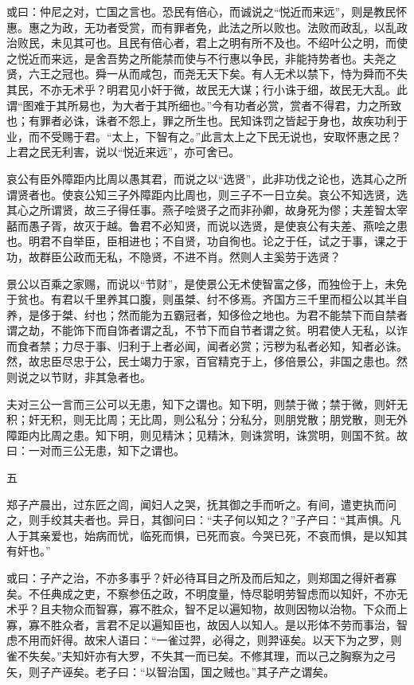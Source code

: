 \documentclass[]{article}
\begin{document}
或曰：仲尼之对，亡国之言也。恐民有倍心，而诚说之``悦近而来远''，则是教民怀惠。惠之为政，无功者受赏，而有罪者免，此法之所以败也。法败而政乱，以乱政治败民，未见其可也。且民有倍心者，君上之明有所不及也。不绍叶公之明，而使之悦近而来远，是舍吾势之所能禁而使与不行惠以争民，非能持势者也。夫尧之贤，六王之冠也。舜一从而咸包，而尧无天下矣。有人无术以禁下，恃为舜而不失其民，不亦无术乎？明君见小奸于微，故民无大谋；行小诛于细，故民无大乱。此谓``图难于其所易也，为大者于其所细也。''今有功者必赏，赏者不得君，力之所致也；有罪者必诛，诛者不怨上，罪之所生也。民知诛罚之皆起于身也，故疾功利于业，而不受赐于君。``太上，下智有之。''此言太上之下民无说也，安取怀惠之民？上君之民无利害，说以``悦近来远''，亦可舍已。

哀公有臣外障距内比周以愚其君，而说之以``选贤''，此非功伐之论也，选其心之所谓贤者也。使哀公知三子外障距内比周也，则三子不一日立矣。哀公不知选贤，选其心之所谓贤，故三子得任事。燕子哙贤子之而非孙卿，故身死为僇；夫差智太宰嚭而愚子胥，故灭于越。鲁君不必知贤，而说以选贤，是使哀公有夫差、燕哙之患也。明君不自举臣，臣相进也；不自贤，功自徇也。论之于任，试之于事，课之于功，故群臣公政而无私，不隐贤，不进不肖。然则人主奚劳于选贤？

景公以百乘之家赐，而说以``节财''，是使景公无术使智富之侈，而独俭于上，未免于贫也。有君以千里养其口腹，则虽桀、纣不侈焉。齐国方三千里而桓公以其半自养，是侈于桀、纣也；然而能为五霸冠者，知侈俭之地也。为君不能禁下而自禁者谓之劫，不能饰下而自饰者谓之乱，不节下而自节者谓之贫。明君使人无私，以诈而食者禁；力尽于事、归利于上者必闻，闻者必赏；污秽为私者必知，知者必诛。然，故忠臣尽忠于公，民士竭力于家，百官精克于上，侈倍景公，非国之患也。然则说之以节财，非其急者也。

夫对三公一言而三公可以无患，知下之谓也。知下明，则禁于微；禁于微，则奸无积；奸无积，则无比周；无比周，则公私分；分私分，则朋党散；朋党散，则无外障距内比周之患。知下明，则见精沐；见精沐，则诛赏明，诛赏明，则国不贫。故曰：一对而三公无患，知下之谓也。

五

郑子产晨出，过东匠之闾，闻妇人之哭，抚其御之手而听之。有间，遣吏执而问之，则手绞其夫者也。异日，其御问曰：``夫子何以知之？''子产曰：``其声惧。凡人于其亲爱也，始病而忧，临死而惧，已死而哀。今哭已死，不哀而惧，是以知其有奸也。''

或曰：子产之治，不亦多事乎？奸必待耳目之所及而后知之，则郑国之得奸者寡矣。不任典成之吏，不察参伍之政，不明度量，恃尽聪明劳智虑而以知奸，不亦无术乎？且夫物众而智寡，寡不胜众，智不足以遍知物，故则因物以治物。下众而上寡，寡不胜众者，言君不足以遍知臣也，故因人以知人。是以形体不劳而事治，智虑不用而奸得。故宋人语曰：``一雀过羿，必得之，则羿诬矣。以天下为之罗，则雀不失矣。''夫知奸亦有大罗，不失其一而已矣。不修其理，而以己之胸察为之弓矢，则子产诬矣。老子曰：``以智治国，国之贼也。''其子产之谓矣。
\end{document}
